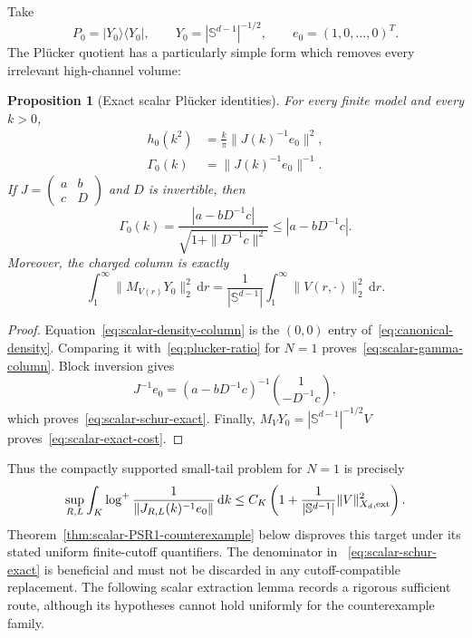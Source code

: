 \documentclass[11pt]{article}
\newcommand{\Sd}{\mathbb S^{d-1}}
\newcommand{\dd}{\,\mathrm d}
\newtheorem{proposition}[theorem]{Proposition}
\theoremstyle{definition}
\theoremstyle{remark}
\begin{document}
Take
\begin{equation}
 P_0=|Y_0\rangle\langle Y_0|,
 \qquad Y_0=|\Sd|^{-1/2},
 \qquad e_0=(1,0,\ldots,0)^T.
 \label{eq:scalar-P0}
\end{equation}
The Pl\"ucker quotient has a particularly simple form which removes every irrelevant high-channel volume:
\begin{proposition}[Exact scalar Pl\"ucker identities]\label{prop:scalar-plucker}
For every finite model and every $k>0$,
\begin{align}
 h_0(k^2)
 &=\frac{k}{\pi}\|J(k)^{-1}e_0\|^2,
 \label{eq:scalar-density-column}\\
 \Gamma_0(k)
 &=\|J(k)^{-1}e_0\|^{-1}.
 \label{eq:scalar-gamma-column}
\end{align}
If $J=\left(\begin{smallmatrix}a&b\\c&D\end{smallmatrix}\right)$ and $D$ is invertible, then
\begin{equation}
 \Gamma_0(k)
 =\frac{|a-bD^{-1}c|}
 {\sqrt{1+\|D^{-1}c\|^2}}
 \leq |a-bD^{-1}c|.
 \label{eq:scalar-schur-exact}
\end{equation}
Moreover, the charged column is exactly
\begin{equation}
 \int_1^\infty\|M_{V(r)}Y_0\|_2^2\dd r
 =\frac1{|\Sd|}\int_1^\infty\|V(r,\cdot)\|_2^2\dd r.
 \label{eq:scalar-exact-cost}
\end{equation}
\end{proposition}

\begin{proof}
Equation~\eqref{eq:scalar-density-column} is the $(0,0)$ entry of~\eqref{eq:canonical-density}.  Comparing it with~\eqref{eq:plucker-ratio} for $N=1$ proves~\eqref{eq:scalar-gamma-column}.  Block inversion gives
\begin{equation}
 J^{-1}e_0
 =(a-bD^{-1}c)^{-1}
 \binom{1}{-D^{-1}c},
\end{equation}
which proves~\eqref{eq:scalar-schur-exact}.  Finally, $M_VY_0=|\Sd|^{-1/2}V$ proves~\eqref{eq:scalar-exact-cost}.
\end{proof}

Thus the compactly supported small-tail problem for $N=1$ is precisely
\begin{equation}
 \sup_{R,L}\int_K
 \log^+\frac1{\|J_{R,L}(k)^{-1}e_0\|}\dd k
 \leq C_K\left(1+\frac1{|\Sd|}\|V\|_{X_d,\rm ext}^2\right).
 \label{eq:scalar-PSR-target}
\end{equation}
Theorem~\ref{thm:scalar-PSR1-counterexample} below disproves this target under
its stated uniform finite-cutoff quantifiers.  The denominator in
~\eqref{eq:scalar-schur-exact} is beneficial and must not be discarded in any
cutoff-compatible replacement.  The following scalar extraction lemma records
a rigorous sufficient route, although its hypotheses cannot hold uniformly for
the counterexample family.
\end{document}
